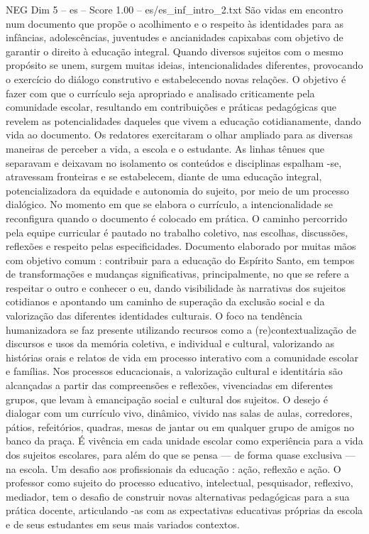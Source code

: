 \begin{textsample}{NEG Dim 5 – es – Score 1.00 – es/es\_inf\_intro\_2.txt}
São vidas em encontro num documento que propõe o acolhimento e o respeito às identidades para as infâncias, adolescências, juventudes e ancianidades capixabas com objetivo de garantir o direito à educação integral.
Quando diversos sujeitos com o mesmo propósito se unem, surgem muitas ideias, intencionalidades diferentes, provocando o exercício do diálogo construtivo e estabelecendo novas relações.
O objetivo é fazer com que o currículo seja apropriado e analisado criticamente pela comunidade escolar, resultando em contribuições e práticas pedagógicas que revelem as potencialidades daqueles que vivem a educação cotidianamente, dando vida ao documento.
Os redatores exercitaram o olhar ampliado para as diversas maneiras de perceber a vida, a escola e o estudante.
As linhas tênues que separavam e deixavam no isolamento os conteúdos e disciplinas espalham -se, atravessam fronteiras e se estabelecem, diante de uma educação integral, potencializadora da equidade e autonomia do sujeito, por meio de um processo dialógico.
No momento em que se elabora o currículo, a intencionalidade se reconfigura quando o documento é colocado em prática.
O caminho percorrido pela equipe curricular é pautado no trabalho coletivo, nas escolhas, discussões, reflexões e respeito pelas especificidades.
Documento elaborado por muitas mãos com objetivo comum : contribuir para a educação do Espírito Santo, em tempos de transformações e mudanças significativas, principalmente, no que se refere a respeitar o outro e conhecer o eu, dando visibilidade às narrativas dos sujeitos cotidianos e apontando um caminho de superação da exclusão social e da valorização das diferentes identidades culturais.
O foco na tendência humanizadora se faz presente utilizando recursos como a (re)contextualização de discursos e usos da memória coletiva, e individual e cultural, valorizando as histórias orais e relatos de vida em processo interativo com a comunidade escolar e famílias.
Nos processos educacionais, a valorização cultural e identitária são alcançadas a partir das compreensões e reflexões, vivenciadas em diferentes grupos, que levam à emancipação social e cultural dos sujeitos.
O desejo é dialogar com um currículo vivo, dinâmico, vivido nas salas de aulas, corredores, pátios, refeitórios, quadras, mesas de jantar ou em qualquer grupo de amigos no banco da praça.
É vivência em cada unidade escolar como experiência para a vida dos sujeitos escolares, para além do que se pensa — de forma quase exclusiva — na escola.
Um desafio aos profissionais da educação : ação, reflexão e ação.
O professor como sujeito do processo educativo, intelectual, pesquisador, reflexivo, mediador, tem o desafio de construir novas alternativas pedagógicas para a sua prática docente, articulando -as com as expectativas educativas próprias da escola e de seus estudantes em seus mais variados contextos.

\end{textsample}
